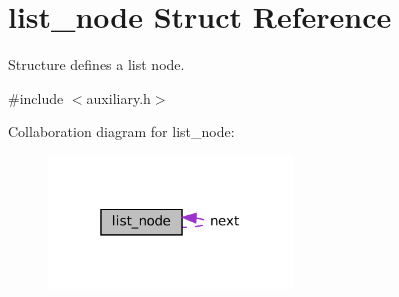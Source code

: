 \hypertarget{structlist__node}{}\section{list\+\_\+node Struct Reference}
\label{structlist__node}


Structure defines a list node.  




{\ttfamily \#include $<$auxiliary.\+h$>$}



Collaboration diagram for list\+\_\+node\+:\nopagebreak
\begin{figure}[H]
\begin{center}
\leavevmode
\includegraphics[width=184pt]{structlist__node__coll__graph}
\end{center}
\end{figure}
